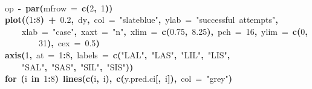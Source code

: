 \documentclass{article}
\makeatletter
\newcommand{\hlnumber}[1]{\textcolor[rgb]{0,0,0}{#1}}%
\newcommand{\hlfunctioncall}[1]{\textcolor[rgb]{.5,0,.33}{\textbf{#1}}}%
\newcommand{\hlstring}[1]{\textcolor[rgb]{.6,.6,1}{#1}}%
\newcommand{\hlkeyword}[1]{\textbf{#1}}%
\newcommand{\hlargument}[1]{\textcolor[rgb]{.69,.25,.02}{#1}}%
\newcommand{\hlassignement}[1]{\textbf{#1}}%
\newcommand{\hlsymbol}[1]{#1}%
\newcommand{\hlstd}[1]{\textcolor[rgb]{0,0,0}{#1}}%
\newenvironment{kframe}{%
 \def\FrameCommand##1{\hskip\@totalleftmargin \hskip-\fboxsep
 \colorbox{shadecolor}{##1}\hskip-\fboxsep
     \hskip-\linewidth \hskip-\@totalleftmargin \hskip\columnwidth}%
 \MakeFramed {\advance\hsize-\width
   \@totalleftmargin\z@ \linewidth\hsize
   \@setminipage}}%
 {\par\unskip\endMakeFramed}
\newenvironment{knitrout}{}{} %
\makeatother
\begin{document}
\begin{knitrout}
{\begin{kframe}
\begin{flushleft}
\hlstd{}\hspace*{\fill}\\
\hlstd{}\hlsymbol{op}{\ }\hlassignement{\usebox{\hlnormalsizeboxlessthan}-}{\ }\hlfunctioncall{par}\hlkeyword{(}\hlargument{mfrow}{\ }\hlargument{=}{\ }\hlfunctioncall{c}\hlkeyword{(}\hlnumber{2}\hlkeyword{,}{\ }\hlnumber{1}\hlkeyword{)}\hlkeyword{)}\hspace*{\fill}\\
\hlstd{}\hlfunctioncall{plot}\hlkeyword{(}\hlkeyword{(}\hlnumber{1}\hlkeyword{:}\hlnumber{8}\hlkeyword{)}{\ }\hlkeyword{+}{\ }\hlnumber{0.2}\hlkeyword{,}{\ }\hlsymbol{d}\hlkeyword{\usebox{\hlnormalsizeboxdollar}}\hlsymbol{y}\hlkeyword{,}{\ }\hlargument{col}{\ }\hlargument{=}{\ }\hlstring{"slateblue"}\hlkeyword{,}{\ }\hlargument{ylab}{\ }\hlargument{=}{\ }\hlstring{"successful{\ }attempts"}\hlkeyword{,}\hspace*{\fill}\\
\hlstd{}{\ }{\ }{\ }{\ }\hlargument{xlab}{\ }\hlargument{=}{\ }\hlstring{"case"}\hlkeyword{,}{\ }\hlargument{xaxt}{\ }\hlargument{=}{\ }\hlstring{"n"}\hlkeyword{,}{\ }\hlargument{xlim}{\ }\hlargument{=}{\ }\hlfunctioncall{c}\hlkeyword{(}\hlnumber{0.75}\hlkeyword{,}{\ }\hlnumber{8.25}\hlkeyword{)}\hlkeyword{,}{\ }\hlargument{pch}{\ }\hlargument{=}{\ }\hlnumber{16}\hlkeyword{,}{\ }\hlargument{ylim}{\ }\hlargument{=}{\ }\hlfunctioncall{c}\hlkeyword{(}\hlnumber{0}\hlkeyword{,}\hspace*{\fill}\\
\hlstd{}{\ }{\ }{\ }{\ }{\ }{\ }{\ }{\ }\hlnumber{31}\hlkeyword{)}\hlkeyword{,}{\ }\hlargument{cex}{\ }\hlargument{=}{\ }\hlnumber{0.5}\hlkeyword{)}\hspace*{\fill}\\
\hlstd{}\hlfunctioncall{axis}\hlkeyword{(}\hlnumber{1}\hlkeyword{,}{\ }\hlargument{at}{\ }\hlargument{=}{\ }\hlnumber{1}\hlkeyword{:}\hlnumber{8}\hlkeyword{,}{\ }\hlargument{labels}{\ }\hlargument{=}{\ }\hlfunctioncall{c}\hlkeyword{(}\hlstring{"LAL"}\hlkeyword{,}{\ }\hlstring{"LAS"}\hlkeyword{,}{\ }\hlstring{"LIL"}\hlkeyword{,}{\ }\hlstring{"LIS"}\hlkeyword{,}\hspace*{\fill}\\
\hlstd{}{\ }{\ }{\ }{\ }\hlstring{"SAL"}\hlkeyword{,}{\ }\hlstring{"SAS"}\hlkeyword{,}{\ }\hlstring{"SIL"}\hlkeyword{,}{\ }\hlstring{"SIS"}\hlkeyword{)}\hlkeyword{)}\hspace*{\fill}\\
\hlstd{}\hlkeyword{for}{\ }\hlkeyword{(}\hlsymbol{i}{\ }\hlkeyword{in}{\ }\hlnumber{1}\hlkeyword{:}\hlnumber{8}\hlkeyword{)}{\ }\hlfunctioncall{lines}\hlkeyword{(}\hlfunctioncall{c}\hlkeyword{(}\hlsymbol{i}\hlkeyword{,}{\ }\hlsymbol{i}\hlkeyword{)}\hlkeyword{,}{\ }\hlfunctioncall{c}\hlkeyword{(}\hlsymbol{y.pred.ci}\hlkeyword{[}\hlkeyword{,}{\ }\hlsymbol{i}\hlkeyword{]}\hlkeyword{)}\hlkeyword{,}{\ }\hlargument{col}{\ }\hlargument{=}{\ }\hlstring{"grey"}\hlkeyword{)}\hspace*{\fill}\\

\end{flushleft}
\end{kframe}}
\end{knitrout}
\end{document}
